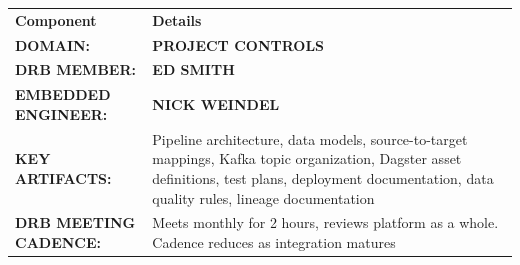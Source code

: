 \documentclass[10pt, a4paper]{article}
\begin{document}
\vspace{0.3em}


\vspace{0.15em}

{\footnotesize
\begin{center}
\begin{tabularx}{0.9\textwidth}{@{}lX@{}}
\rowcolor{black!10}
\textbf{Component} & \textbf{Details} \\
\rowcolor{white}
\textbf{DOMAIN:} & \textbf{PROJECT CONTROLS} \\
\rowcolor{kipgray!10}
\textbf{DRB MEMBER:} & \textbf{ED SMITH} \\
\rowcolor{white}
\textbf{EMBEDDED ENGINEER:} & \textbf{NICK WEINDEL} \\
\rowcolor{kipgray!10}
\textbf{KEY ARTIFACTS:} & Pipeline architecture, data models, source-to-target mappings, Kafka topic organization, Dagster asset definitions, test plans, deployment documentation, data quality rules, lineage documentation \\
\rowcolor{white}
\textbf{DRB MEETING CADENCE:} & Meets monthly for 2 hours, reviews platform as a whole. Cadence reduces as integration matures \\
\end{tabularx}
\end{center}
}

\newpage


\vspace{0.2em}
\end{document}
